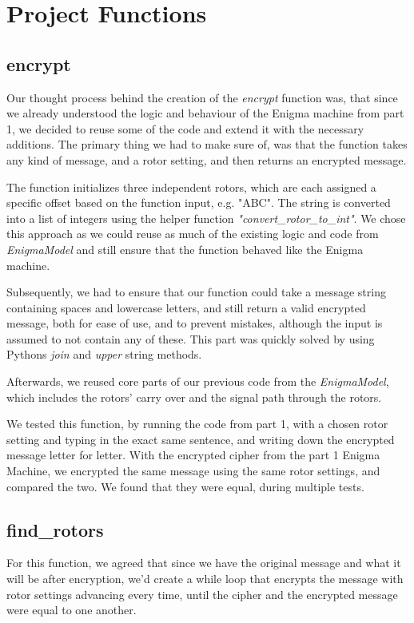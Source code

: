 \documentclass{article}
\begin{document}
\pagebreak
\section{Project Functions}

\subsection{encrypt}
Our thought process behind the creation of the \textit{encrypt} function was, that since we already understood the logic and 
behaviour of the Enigma machine from part 1, we decided to reuse some of the code and extend it with the necessary additions.
The primary thing we had to make sure of, was that the function takes any kind of message, and a rotor setting, and then returns an encrypted message. 

The function initializes three independent rotors, which are each assigned a specific offset based on the function input, e.g. "ABC".
The string is converted into a list of integers using the helper function \textit{"convert\_rotor\_to\_int"}.
We chose this approach as we could reuse as much of the existing logic and code from \textit{EnigmaModel} and still ensure that the function behaved like the Enigma machine.

Subsequently, we had to ensure that our function could take a message string containing spaces and lowercase letters, and still return a valid 
encrypted message, both for ease of use, and to prevent mistakes, although the input is assumed to not contain any of these. This part was quickly solved by using Pythons \textit{join} and \textit{upper} string methods.

Afterwards, we reused core parts of our previous code from the \textit{EnigmaModel}, which includes the rotors' carry over and the signal path through the rotors.

We tested this function, by running the code from part 1, with a chosen rotor setting and typing in the exact same sentence, and writing down the encrypted message letter for letter.
With the encrypted cipher from the part 1 Enigma Machine, we encrypted the same message using the same rotor settings, and compared the two. We found that they were equal, during multiple tests.

\subsection{find\_rotors}
For this function, we agreed that since we have the original message and what it will be after encryption, 
we'd create a while loop that encrypts the message with rotor settings advancing every time, until the cipher and the encrypted message were equal to one another.
\end{document}
